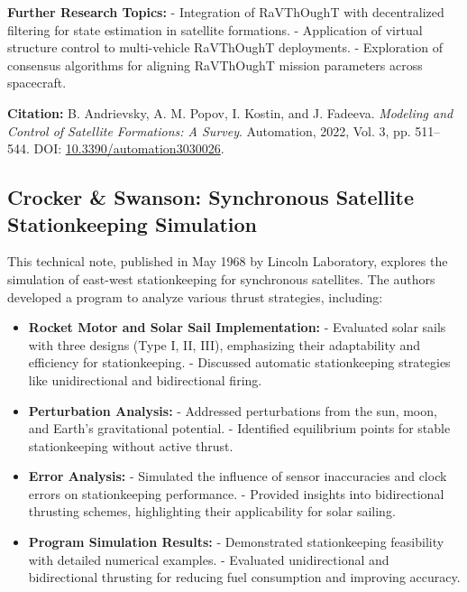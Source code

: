 \textbf{Further Research Topics:}
- Integration of RaVThOughT with decentralized filtering for state estimation in satellite formations.
- Application of virtual structure control to multi-vehicle RaVThOughT deployments.
- Exploration of consensus algorithms for aligning RaVThOughT mission parameters across spacecraft.

\textbf{Citation:}
B. Andrievsky, A. M. Popov, I. Kostin, and J. Fadeeva. \textit{Modeling and Control of Satellite Formations: A Survey}. Automation, 2022, Vol. 3, pp. 511–544. DOI: \href{https://doi.org/10.3390/automation3030026}{10.3390/automation3030026}.

\subsection{Crocker \& Swanson: Synchronous Satellite Stationkeeping Simulation}

This technical note, published in May 1968 by Lincoln Laboratory, explores the simulation of east-west stationkeeping for synchronous satellites. The authors developed a program to analyze various thrust strategies, including:

\begin{itemize}
    \item \textbf{Rocket Motor and Solar Sail Implementation:}
    - Evaluated solar sails with three designs (Type I, II, III), emphasizing their adaptability and efficiency for stationkeeping.
    - Discussed automatic stationkeeping strategies like unidirectional and bidirectional firing.
    
    \item \textbf{Perturbation Analysis:}
    - Addressed perturbations from the sun, moon, and Earth's gravitational potential.
    - Identified equilibrium points for stable stationkeeping without active thrust.

    \item \textbf{Error Analysis:}
    - Simulated the influence of sensor inaccuracies and clock errors on stationkeeping performance.
    - Provided insights into bidirectional thrusting schemes, highlighting their applicability for solar sailing.

    \item \textbf{Program Simulation Results:}
    - Demonstrated stationkeeping feasibility with detailed numerical examples.
    - Evaluated unidirectional and bidirectional thrusting for reducing fuel consumption and improving accuracy.
\end{itemize}

